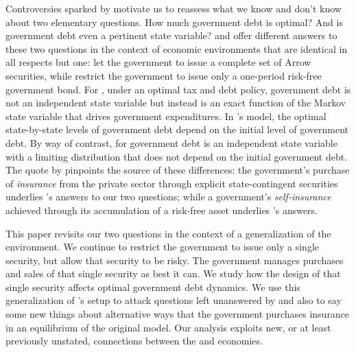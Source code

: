 \documentclass[12pt]{article}
\begin{document}
Controversies sparked by  \citet{Reinhart2010} motivate us to reassess what we know and don't know about two elementary questions.
How much government debt is optimal? And  is government debt  even a pertinent state variable? %
\citet{LucasJr.1983} and \citet{Aiyagari2002} offer  different answers to these two
questions in the context of  economic environments that are identical in all respects but one: \citet{LucasJr.1983} let the government to issue
a complete set of Arrow securities, while   \citet{Aiyagari2002} restrict the government to issue only a one-period risk-free government bond.  For
\citeauthor{LucasJr.1983}, under an optimal tax and debt policy,  government debt is not an independent state variable but instead is an exact function of
 the Markov state variable that  drives government expenditures.  In \citeauthor{LucasJr.1983}'s model, the optimal state-by-state levels 
 of government debt  depend on the initial level of
 government debt.  By way of contrast, for \citet{Aiyagari2002} government debt is an independent state variable with a limiting distribution
 that does not depend on the initial government debt.  The quote by \citeauthor{LucasJr.1983} pinpoints the source of these differences:
 the government's purchase of {\em insurance} from the private sector  through explicit state-contingent securities underlies \citeauthor{LucasJr.1983}'s
 answers to our two questions; while a government's {\em self-insurance} achieved through its accumulation of
 a risk-free asset underlies \citeauthor{Aiyagari2002}'s answers.

This paper revisits  our two questions in the context of a generalization of the \citet{Aiyagari2002} environment.  We continue to restrict
the government to issue only a single security, but  allow that security to be risky.  The  government
manages purchases and sales of that single security as best it can.  We study how the  design of that single security affects optimal government debt dynamics.
We use this generalization of \citeauthor{Aiyagari2002}'s setup to attack questions left unanswered by \citeauthor{Aiyagari2002}
and also to say some new things about alternative ways that  the government purchases  insurance in an equilibrium of the original    \citet{LucasJr.1983}
model. %
Our analysis exploits  new, or at least previously unstated, connections between the   \citet{LucasJr.1983}  and \citeauthor{Aiyagari2002} economies.
\end{document}
